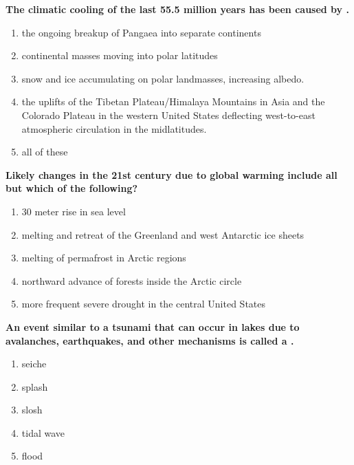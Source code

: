 \item {
\setlength{\itemsep}{0cm}
\setlength{\parskip}{.2cm}
\begin{samepage}
\textbf{
The climatic cooling of the last 55.5 million years has been caused by \makebox[1cm]{\Rivpt\hrulefill\Rivpt}.
}
\begin{enumerate}
\item {  the ongoing breakup of Pangaea into separate continents   }
\item {  continental masses moving into polar latitudes }
\item {  snow and ice accumulating on polar landmasses, increasing albedo.  }
\item {  the uplifts of the Tibetan Plateau/Himalaya Mountains in Asia and the Colorado Plateau in the western United States deflecting west-to-east atmospheric circulation in the midlatitudes. }
\item {  all of these }
\end{enumerate}
\end{samepage}
}
\item {
\setlength{\itemsep}{0cm}
\setlength{\parskip}{.2cm}
\begin{samepage}
\textbf{
Likely changes in the 21st century due to global warming include all but which of the following?
}
\begin{enumerate}
\item {  30 meter rise in sea level }
\item {  melting and retreat of the Greenland and west Antarctic ice sheets }
\item {  melting of permafrost in Arctic regions }
\item {  northward advance of forests inside the Arctic circle }
\item {  more frequent severe drought in the central United States }
\end{enumerate}
\end{samepage}
}
\item {
\setlength{\itemsep}{0cm}
\setlength{\parskip}{.2cm}
\begin{samepage}
\textbf{
An event similar to a tsunami that can occur in lakes due to avalanches, earthquakes, and other mechanisms is called a \makebox[1cm]{\Rivpt\hrulefill\Rivpt}.
}
\begin{enumerate}
\item { 	seiche }
\item { 	splash }
\item { 	slosh }
\item { 	tidal wave }
\item { 	flood }
\end{enumerate}
\end{samepage}
}
